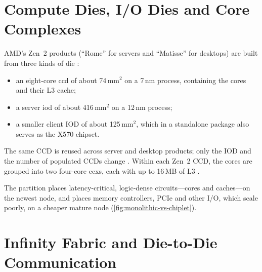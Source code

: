 \section{Compute Dies, I/O Dies and Core Complexes}
\label{sec:ccd-iod}



AMD's Zen~2 products (``Rome'' for servers and ``Matisse'' for desktops) are built from three kinds of die \cite{naffziger2020chiplet,suggs2019zen2}:
\begin{itemize}
  \item an eight-core \gls{ccd} of about 74\,mm$^2$ on a 7\,nm process, containing the cores and their L3 cache;
  \item a server \gls{iod} of about 416\,mm$^2$ on a 12\,nm process;
  \item a smaller client IOD of about 125\,mm$^2$, which in a standalone package also serves as the X570 chipset.
\end{itemize}
The same CCD is reused across server and desktop products; only the IOD and the number of populated CCDs change \cite{naffziger2020chiplet}. Within each Zen~2 CCD, the cores are grouped into two four-core \glspl{ccx}, each with up to 16\,MB of L3 \cite{suggs2019zen2}.

The partition places latency-critical, logic-dense circuits---cores and caches---on the newest node, and places memory controllers, PCIe and other I/O, which scale poorly, on a cheaper mature node (\cref{fig:monolithic-vs-chiplet}).


\section{Infinity Fabric and Die-to-Die Communication}
\label{sec:d2d}


